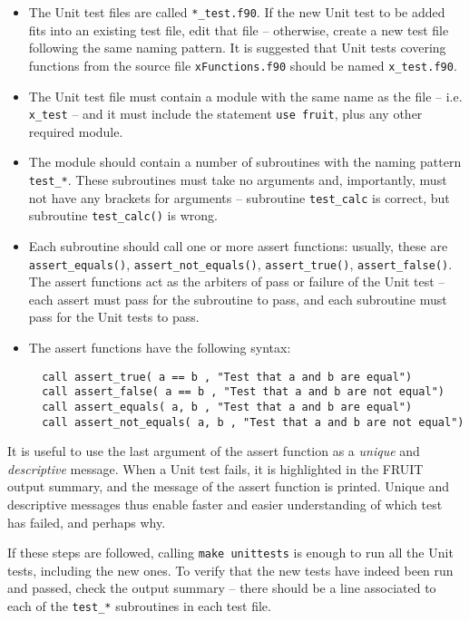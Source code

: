 \begin{itemize}
\item The Unit test files are called \texttt{*\_test.f90}. If the new
  Unit test to be added fits into an existing test file, edit that
  file -- otherwise, create a new test file following the same naming
  pattern. It is suggested that Unit tests covering functions from the
  source file \texttt{xFunctions.f90} should be named
  \texttt{x\_test.f90}.
\item The Unit test file must contain a module with the same name as
  the file -- i.e. \texttt{x\_test} -- and it must include the
  statement \verb|use fruit|, plus any other required module.
\item The module should contain a number of subroutines with the
  naming pattern \texttt{test\_*}. These subroutines must take no
  arguments and, importantly, must not have any brackets for arguments
  -- subroutine \texttt{test\_calc} is correct, but subroutine
  \texttt{test\_calc()} is wrong.
\item Each subroutine should call one or more assert functions:
  usually, these are \texttt{assert\_equals()}, \texttt{assert\_not\_equals()},
  \texttt{assert\_true()}, \texttt{assert\_false()}. The assert functions
  act as the arbiters of pass or failure of the Unit test -- each
  assert must pass for the subroutine to pass, and each subroutine
  must pass for the Unit tests to pass.
\item The assert functions have the following syntax:
  \begin{verbatim}
  call assert_true( a == b , "Test that a and b are equal")
  call assert_false( a == b , "Test that a and b are not equal")
  call assert_equals( a, b , "Test that a and b are equal")
  call assert_not_equals( a, b , "Test that a and b are not equal")
  \end{verbatim}
\end{itemize}

It is useful to use the last argument of the assert function as a
\emph{unique} and \emph{descriptive} message. When a Unit test fails,
it is highlighted in the FRUIT output summary, and the message of the
assert function is printed. Unique and descriptive messages thus
enable faster and easier understanding of which test has failed,
and perhaps why.

If these steps are followed, calling \texttt{make\ unittests} is
enough to run all the Unit tests, including the new ones. To verify
that the new tests have indeed been run and passed, check the output
summary -- there should be a line associated to each of the
\texttt{test\_*} subroutines in each test file.

